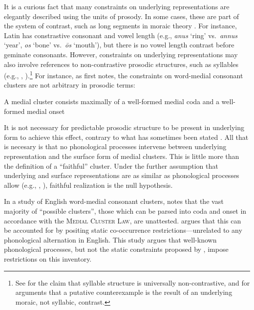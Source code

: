 \label{gaps} 

It is a curious fact that many constraints on underlying representations are elegantly described using the units of prosody.
In some cases, these are part of the system of contrast, such as long segments in moraic theory \citep[e.g.,][]{Davis1999}. For instance, Latin has constrastive consonant and vowel length (e.g., \emph{anus} `ring' vs.~\emph{annus} `year', \emph{os} `bone' vs.~\emph{ōs} `mouth'), but there is no vowel length contrast before geminate consonants. 
However, constraints on underlying representations may also involve references to non-contrastive prosodic structures, such as syllables (e.g., \citealt{Hooper1973}, \citealt{Kahn1976}).\footnote{
    See \citealt{Blevins1995} for the claim that syllable structure is universally non-contrastive, and \citealt{Elfner2006} for arguments that a putative counterexample is the result of an underlying moraic, not syllabic, contrast.}
For instance, as \citeauthor{Haugen1956} first notes, the constraints on word-medial consonant clusters are not arbitrary in prosodic terms:

\begin{example}
\label{mcl}
A medial cluster consists maximally of a well-formed medial coda and a well-formed medial onset
\end{example}

\noindent
It is not necessary for predictable prosodic structure to be present in underlying form to achieve this effect, contrary to what has sometimes been stated \citep[e.g.,][255]{A74}.
All that is necesary is that no phonological processes intervene between underlying representation and the surface form of medial clusters.
This is little more than the definition of a ``faithful'' cluster.
Under the further assumption that underlying and surface representations are as similar as phonological processes allow (e.g., \citealt[205f.]{Dell1973}, \citealt[28f.]{Stampe1973}), faithful realization is the null hypothesis.

In a study of English word-medial consonant clusters, \citet{Pierrehumbert1994} notes that the vast majority of ``possible clusters'', those which can be parsed into coda and onset in accordance with the \textsc{Medial Cluster Law}, are unattested.
\citeauthor{Pierrehumbert1994} argues that this can be accounted for by positing static co-occurrence restrictions---unrelated to any phonological alternation in English.
This study argues that well-known phonological processes, but not the static constraints proposed by \citeauthor{Pierrehumbert1994}, impose restrictions on this inventory.

